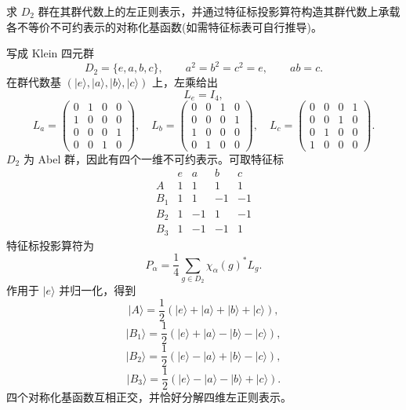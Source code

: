 \begin{question}[10 分]
求 $D_2$ 群在其群代数上的左正则表示，并通过特征标投影算符构造其群代数上承载各不等价不可约表示的对称化基函数(如需特征标表可自行推导)。
\begin{solution}
写成 Klein 四元群
\[
D_2=\{e,a,b,c\},\qquad a^2=b^2=c^2=e,\qquad ab=c.
\]
在群代数基 $(|e\rangle,|a\rangle,|b\rangle,|c\rangle)$ 上，左乘给出
\[
L_e=I_4,
\]
\[
L_a=\begin{pmatrix}0&1&0&0\\1&0&0&0\\0&0&0&1\\0&0&1&0\end{pmatrix},\quad
L_b=\begin{pmatrix}0&0&1&0\\0&0&0&1\\1&0&0&0\\0&1&0&0\end{pmatrix},\quad
L_c=\begin{pmatrix}0&0&0&1\\0&0&1&0\\0&1&0&0\\1&0&0&0\end{pmatrix}.
\]
$D_2$ 为 Abel 群，因此有四个一维不可约表示。可取特征标
\[
\begin{array}{c|rrrr}
&e&a&b&c\\\hline
A&1&1&1&1\\
B_1&1&1&-1&-1\\
B_2&1&-1&1&-1\\
B_3&1&-1&-1&1
\end{array}
\]
特征标投影算符为
\[
P_\alpha=\frac14\sum_{g\in D_2}\chi_\alpha(g)^*L_g.
\]
作用于 $|e\rangle$ 并归一化，得到
\[
\boxed{|A\rangle=\frac12(|e\rangle+|a\rangle+|b\rangle+|c\rangle)},
\]
\[
\boxed{|B_1\rangle=\frac12(|e\rangle+|a\rangle-|b\rangle-|c\rangle)},
\]
\[
\boxed{|B_2\rangle=\frac12(|e\rangle-|a\rangle+|b\rangle-|c\rangle)},
\]
\[
\boxed{|B_3\rangle=\frac12(|e\rangle-|a\rangle-|b\rangle+|c\rangle)}.
\]
四个对称化基函数互相正交，并恰好分解四维左正则表示。
\end{solution}
\end{question}

